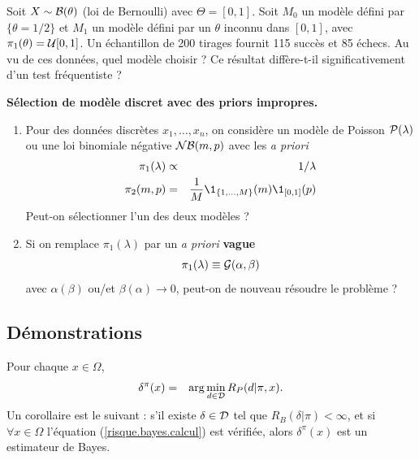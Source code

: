 \documentclass[10pt]{article}
\begin{document}
 

\if{}
\begin{exec}
Soit $X\sim{\cal{B}}(\theta)$ (loi de Bernoulli) avec $\Theta=[0,1]$. Soit $M_0$ un modèle défini par $\{\theta=1/2\}$ et $M_1$ un modèle défini par un $\theta$ inconnu dans $[0,1]$, avec $\pi_1(\theta)={\cal{U}}[0,1]$. Un échantillon de 200 tirages fournit 115 succès et 85 échecs. Au vu de ces données, quel modèle choisir ? Ce résultat diffère-t-il significativement d'un test fréquentiste ?
\end{exec}


 

\if{}
\begin{exec}{\bf Sélection de modèle discret avec des priors impropres.}
\begin{enumerate}
    \item Pour des données discrètes $x_1,\ldots,x_n$, on considère un modèle de Poisson ${\cal{P}}(\lambda)$ ou une loi binomiale négative ${\cal{NB}}(m,p)$ avec les {\it a priori} 
\begin{eqnarray*}
\pi_1(\lambda) & \propto & 1/\lambda \\
\pi_2(m,p) & = & \frac{1}{M} \1_{\{1,\ldots,M\}}(m) \1_{[0,1]}(p)
\end{eqnarray*}
Peut-on sélectionner l'un des deux modèles ?
\item Si on remplace $\pi_1(\lambda)$ par un {\it a priori} {\bf vague}
$$
\pi_1(\lambda)  \equiv  {\cal{G}}(\alpha,\beta)
$$
avec $\alpha(\beta)$ ou/et $\beta(\alpha) \to 0$, peut-on de nouveau résoudre le problème ? 
\end{enumerate}
\end{exec}

 \vspace{1cm} 
\fi


\subsection{Démonstrations}


\if{}
\begin{theorem}
Pour chaque $x\in\Omega$,
\begin{eqnarray}
\delta^{\pi}(x) & = & \arg\min\limits_{d\in{\cal{D}}}  R_P(d|\pi,x). \label{risque.bayes.calcul}
\end{eqnarray}
Un corollaire est le suivant : s'il existe $\delta\in{\cal{D}}$ tel que $R_B(\delta|\pi)<\infty$, et si $\forall x\in \Omega$ l'équation (\ref{risque.bayes.calcul}) est vérifiée, alors $\delta^{\pi}(x)$ est un estimateur de Bayes.
\end{theorem}
\end{document}

